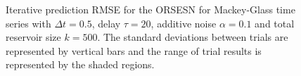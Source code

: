 \begin{figure}
    \centering




    \caption{Iterative prediction RMSE for the ORSESN for Mackey-Glass time series with $\Delta t=0.5$, delay $\tau=20$, additive noise $\alpha=0.1$ and total reservoir size $k=500$. The standard deviations between trials are represented by vertical bars and the range of trial results is represented by the shaded regions.}
    \label{fig:ORSESN_mg_iterative}
\end{figure}

